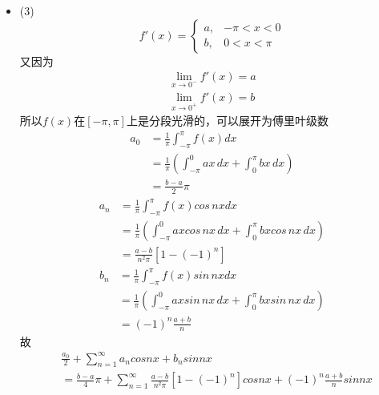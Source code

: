 \documentclass{article}
\begin{document}
\begin{itemize}
  \item (3)
        \begin{equation*}
          f'(x) = \begin{cases}
            a, & -\pi < x < 0 \\
            b, & 0 < x < \pi
          \end{cases}
        \end{equation*}
        又因为
        \begin{align*}
          \lim\limits_{x \to 0^-} f'(x) = a \\
          \lim\limits_{x \to 0^+} f'(x) = b
        \end{align*}
        所以$f(x)$在$[-\pi, \pi]$上是分段光滑的，可以展开为傅里叶级数
        \begin{align*}
          a_0
           & = \frac{1}{\pi} \int_{-\pi}^{\pi} f(x) dx                                        \\
           & = \frac{1}{\pi} \left(\int_{-\pi}^{0} ax \, dx + \int_{0}^{\pi} bx \, dx \right) \\
           & = \frac{b - a}{2} \pi
        \end{align*}
        \begin{align*}
          a_n
           & = \frac{1}{\pi} \int_{-\pi}^{\pi} f(x) cos\, nx dx                                                 \\
           & = \frac{1}{\pi} \left(\int_{-\pi}^{0} ax cos\, nx \, dx + \int_{0}^{\pi} bx cos\, nx \, dx \right) \\
           & = \frac{a - b}{n^2 \pi} [1 - (-1)^n]
        \end{align*}
        \begin{align*}
          b_n
           & = \frac{1}{\pi} \int_{-\pi}^{\pi} f(x) sin\, nx dx                                                 \\
           & = \frac{1}{\pi} \left(\int_{-\pi}^{0} ax sin\, nx \, dx + \int_{0}^{\pi} bx sin\, nx \, dx \right) \\
           & = (-1)^n \frac{a + b}{n}
        \end{align*}
        故
        \begin{align*}
           & \frac{a_0}{2} + \sum\limits_{n = 1}^{\infty} a_n cos nx + b_n sin nx \\
           & = \frac{b - a}{4} \pi +
          \sum\limits_{n = 1}^{\infty} \frac{a - b}{n^2 \pi} [1 - (-1)^n] cos nx +  (-1)^n \frac{a + b}{n} sin nx
        \end{align*}
\end{itemize}
\end{document}

